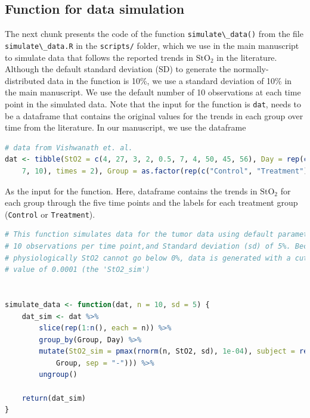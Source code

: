 \documentclass[
]{article}
\newcommand{\passthrough}[1]{#1}
\begin{document}
\hypertarget{function-for-data-simulation}{%
\subsection{Function for data simulation}\label{function-for-data-simulation}}

The next chunk presents the code of the function \passthrough{\lstinline!simulate\_data()!} from the file \passthrough{\lstinline!simulate\_data.R!} in the \passthrough{\lstinline!scripts/!} folder, which we use in the main manuscript to simulate data that follows the reported trends in \(\mbox{StO}_2\) in the literature. Although the default standard deviation (SD) to generate the normally-distributed data in the function is 10\%, we use a standard deviation of 10\% in the main manuscript. We use the default number of 10 observations at each time point in the simulated data. Note that the input for the function is \passthrough{\lstinline!dat!}, needs to be a dataframe that contains the original values for the trends in each group over time from the literature. In our manuscript, we use the dataframe

\begin{lstlisting}[language=R]
# data from Vishwanath et. al.
dat <- tibble(StO2 = c(4, 27, 3, 2, 0.5, 7, 4, 50, 45, 56), Day = rep(c(0, 2, 5,
    7, 10), times = 2), Group = as.factor(rep(c("Control", "Treatment"), each = 5)))
\end{lstlisting}

As the input for the function. Here, dataframe contains the trends in \(\mbox{StO}_2\) for each group through the five time points and the labels for each treatment group (\passthrough{\lstinline!Control!} or \passthrough{\lstinline!Treatment!}).

\begin{lstlisting}[language=R]
# This function simulates data for the tumor data using default parameters of
# 10 observations per time point,and Standard deviation (sd) of 5%. Because
# physiologically StO2 cannot go below 0%, data is generated with a cutoff
# value of 0.0001 (the 'StO2_sim')


simulate_data <- function(dat, n = 10, sd = 5) {
    dat_sim <- dat %>%
        slice(rep(1:n(), each = n)) %>%
        group_by(Group, Day) %>%
        mutate(StO2_sim = pmax(rnorm(n, StO2, sd), 1e-04), subject = rep(1:10), subject = factor(paste(subject,
            Group, sep = "-"))) %>%
        ungroup()

    return(dat_sim)
}
\end{lstlisting}
\end{document}

